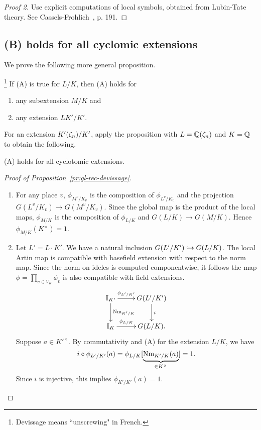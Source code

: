 \begin{proof}[Proof 2]
Use explicit computations of local symbols, obtained from Lubin-Tate theory. See Cassels-Frohlich~\cite{CF69}, p. 191.
\end{proof}
\subsection{(B) holds for all cyclomic extensions}
We prove the following more general proposition.
\begin{pr}[Devissage]\footnote{Devissage means ``unscrewing" in French.}
If (A) is true for $L/K$, then (A) holds for
\begin{enumerate}
\item
any subextension $M/K$ and
\item 
any extension $LK'/K'$.
\end{enumerate}
\end{pr}
For an extension $K'(\zeta_n)/K'$, apply the proposition with $L=\mathbb{Q}(\zeta_n)$ and $K=\mathbb{Q}$ to obtain the following.
\begin{cor}
(A) holds for all cyclotomic extensions.
\end{cor}
\begin{proof}[Proof of Proposition~\ref{pr:gl-rec-devissage}]$\,$
\begin{enumerate}
\item
For any place $v$, $\phi_{M^v/K_v}$ is the composition of $\phi_{L^v/K_v}$ and the projection $G(L^v/K_v)\to G(M^v/K_v)$. Since the global map is the product of the local maps, $\phi_{M/K}$ is the composition of $\phi_{L/K}$ and $G(L/K)\to G(M/K)$. Hence $\phi_{M/K}(K^{\times})=1$.
\item Let $L'=L\cdot K'$. 
We have a natural inclusion $G(L'/K')\hookrightarrow G(L/K)$. 
The local Artin map is compatible with basefield extension with respect to the norm map. Since the norm on ideles is computed componentwise, it follows the map $\phi=\prod_{v\in V_K}\phi_v$ is also compatible with field extensions.
%
\[
\xymatrix{
\I_{K'}\ar[r]^-{\phi_{L'/K'}}\ar[d]^{\nm_{K'/K}} & G(L'/K')\ar[d]^i\\
\I_K\ar[r]^-{\phi_{L/K}}& G(L/K).
}
\]
Suppose $a\in {K'}^{\times}$. By commutativity and (A) for the extension $L/K$, we have
\[
i\circ \phi_{L'/K'}(a)=\phi_{L/K}[\underbrace{\operatorname{Nm}_{K'/K}(a)}_{\in K^{\times}}]=1.
\]
Since $i$ is injective, this implies $\phi_{K'/K'}(a)=1$.
\qedhere
\end{enumerate}
\end{proof}
